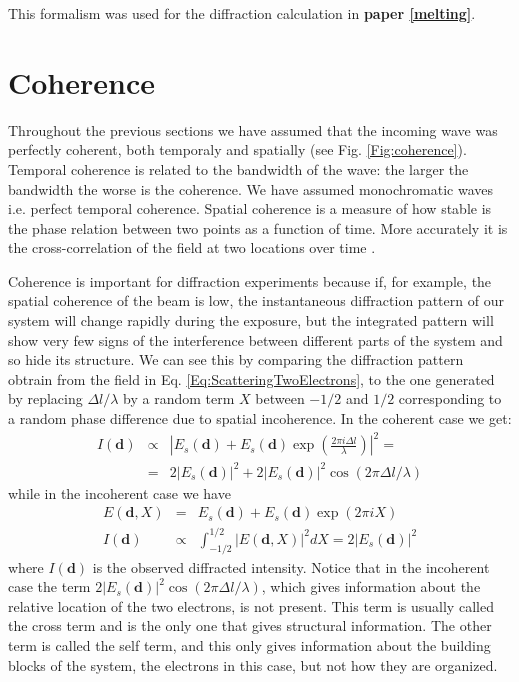 This formalism was used for the diffraction calculation in {\bf paper \ref{melting}}.

\section{Coherence}\label{coherence}

Throughout the previous sections we have assumed that the incoming wave was
perfectly coherent, both temporaly and spatially (see Fig. \ref{Fig:coherence}). Temporal coherence is related
to the bandwidth of the wave: the larger the bandwidth the worse is the
coherence. We have assumed monochromatic waves i.e. perfect temporal
coherence. Spatial coherence is a measure of how stable is the phase relation between
two points as a function of time. More accurately it is the cross-correlation of the field at two locations over time \cite{Attwood2007Soft}. 

Coherence is important for diffraction experiments \cite{HauRiege2008Effect} because if, for example, the
spatial coherence of the beam is low, the instantaneous diffraction pattern of
our system will change rapidly during the exposure, but the integrated pattern
will show very few signs of the interference between different parts of the
system and so hide its structure. We can see this by comparing the diffraction
pattern obtrain from the field in Eq. \ref{Eq:ScatteringTwoElectrons}, to the
one generated by replacing $\Delta l/\lambda$ by a random term $X$
between $-1/2$ and $1/2$ corresponding to a random phase difference due to
spatial incoherence. In the coherent case we get:
\begin{eqnarray}
  I(\mathbf d)  & \propto & |E_s(\mathbf d) + E_s(\mathbf d) \exp(\frac{2 \pi i \Delta
    l}{\lambda})|^2  = \nonumber \\
 & = & 2 |E_s(\mathbf d)|^2 + 2 |E_s(\mathbf d)|^2
  \cos(2 \pi \Delta l / \lambda)
\end{eqnarray}
 while in the incoherent case we have
\begin{eqnarray}
 E(\mathbf d,X) & = &  E_s(\mathbf d) + E_s(\mathbf d) \exp(2 \pi i X) \nonumber
 \\
I(\mathbf d)  & \propto & \int_{-1/2}^{1/2} |E(\mathbf d,X)|^2 dX = 2 |E_s(\mathbf d)|^2
\end{eqnarray}
where $I(\mathbf d)$ is the observed diffracted intensity. Notice that in the
incoherent case the term $2 |E_s(\mathbf d)|^2 \cos(2 \pi \Delta l / \lambda)$,
which gives information about the relative location of the two electrons, is not
present. This term is usually called the cross term and is the only one that
gives structural information. The other term is called the self term, and this only gives
information about the building blocks of the system, the electrons in this case,
but not how they are organized.

